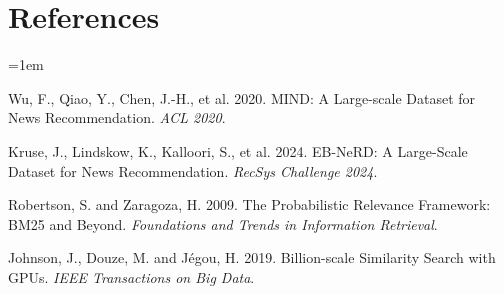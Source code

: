 \documentclass[11pt]{article}
\begin{document}
\section*{References}

\begingroup
\small
\setlength{\parindent}{-1em}
\leftskip=1em
\setlength{\parskip}{2pt}

Wu, F., Qiao, Y., Chen, J.-H., et al. 2020. MIND: A Large-scale Dataset for News
Recommendation. \emph{ACL 2020}.

Kruse, J., Lindskow, K., Kalloori, S., et al. 2024. EB-NeRD: A Large-Scale Dataset for News
Recommendation. \emph{RecSys Challenge 2024}.

Robertson, S. and Zaragoza, H. 2009. The Probabilistic Relevance Framework: BM25 and Beyond.
\emph{Foundations and Trends in Information Retrieval}.

Johnson, J., Douze, M. and J\'egou, H. 2019. Billion-scale Similarity Search with GPUs.
\emph{IEEE Transactions on Big Data}.
\par
\endgroup
\end{document}

